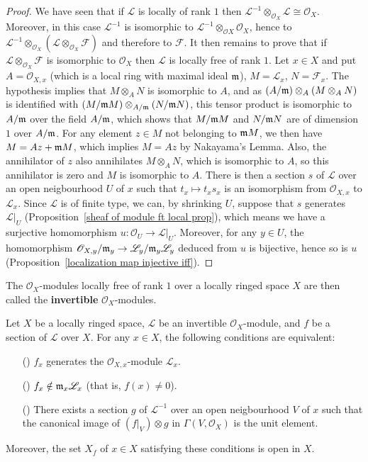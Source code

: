 \begin{proof}
We have seen that if $\mathscr{L}$ is locally of rank $1$ then $\mathscr{L}^{-1}\otimes_{\mathscr{O}_X}\mathscr{L}\cong\mathscr{O}_X$. Moreover, in this case $\mathscr{L}^{-1}$ is isomorphic to $\mathscr{L}^{-1}\otimes_{\mathscr{O}X}\mathscr{O}_X$, hence to $\mathscr{L}^{-1}\otimes_{\mathscr{O}_X}(\mathscr{L}\otimes_{\mathscr{O}_X}\mathscr{F})$ and therefore to $\mathscr{F}$. It then remains to prove that if $\mathscr{L}\otimes_{\mathscr{O}_X}\mathscr{F}$ is isomorphic to $\mathscr{O}_X$ then $\mathscr{L}$ is locally free of rank $1$. Let $x\in X$ and put $A=\mathscr{O}_{X,x}$ (which is a local ring with maximal ideal $\mathfrak{m}$), $M=\mathscr{L}_x$, $N=\mathscr{F}_x$. The hypothesis implies that $M\otimes_AN$ is isomorphic to $A$, and as $(A/\mathfrak{m})\otimes_A(M\otimes_AN)$ is identified with $(M/\mathfrak{m} M)\otimes_{A/\mathfrak{m}}(N/\mathfrak{m} N)$, this tensor product is isomorphic to $A/\mathfrak{m}$ over the field $A/\mathfrak{m}$, which shows that $M/\mathfrak{m} M$ and $N/\mathfrak{m} N$ are of dimension $1$ over $A/\mathfrak{m}$. For any element $z\in M$ not belonging to $\mathfrak{m} M$, we then have $M=Az+\mathfrak{m} M$, which implies $M=Az$ by Nakayama's Lemma. Also, the annihilator of $z$ also annihilates $M\otimes_AN$, which is isomorphic to $A$, so this annihilator is zero and $M$ is isomorphic to $A$. There is then a section $s$ of $\mathscr{L}$ over an open neigbourhood $U$ of $x$ such that $t_x\mapsto t_xs_x$ is an isomorphism from $\mathscr{O}_{X,x}$ to $\mathscr{L}_x$. Since $\mathscr{L}$ is of finite type, we can, by shrinking $U$, suppose that $s$ generates $\mathscr{L}|_U$ (Proposition~\ref{sheaf of module ft local prop}), which means we have a surjective homomorphism $u:\mathscr{O}_U\to\mathscr{L}|_U$. Moreover, for any $y\in U$, the homomorphism $\mathscr{O}_{X,y}/\mathfrak{m}_y\to\mathscr{L}_y/\mathfrak{m}_y\mathscr{L}_y$ deduced from $u$ is bijective, hence so is $u$ (Proposition~\ref{localization map injective iff}).
\end{proof}
The $\mathscr{O}_X$-modules locally free of rank $1$ over a locally ringed space $X$ are then called the \textbf{invertible} $\mathscr{O}_X$-modules.
\begin{proposition}\label{sheaf of module invertible section zero iff}
Let $X$ be a locally ringed space, $\mathscr{L}$ be an invertible $\mathscr{O}_X$-module, and $f$ be a section of $\mathscr{L}$ over $X$. For any $x\in X$, the following conditions are equivalent:
\begin{itemize}
\item[(\rmnum{1})] $f_x$ generates the $\mathscr{O}_{X,x}$-module $\mathscr{L}_x$.
\item[(\rmnum{2})] $f_x\notin\mathfrak{m}_x\mathscr{L}_x$ (that is, $f(x)\neq 0$).
\item[(\rmnum{3})] There exists a section $g$ of $\mathscr{L}^{-1}$ over an open neigbourhood $V$ of $x$ such that the canonical image of $(f|_V)\otimes g$ in $\Gamma(V,\mathscr{O}_X)$ is the unit element.
\end{itemize}
Moreover, the set $X_f$ of $x\in X$ satisfying these conditions is open in $X$.
\end{proposition}
